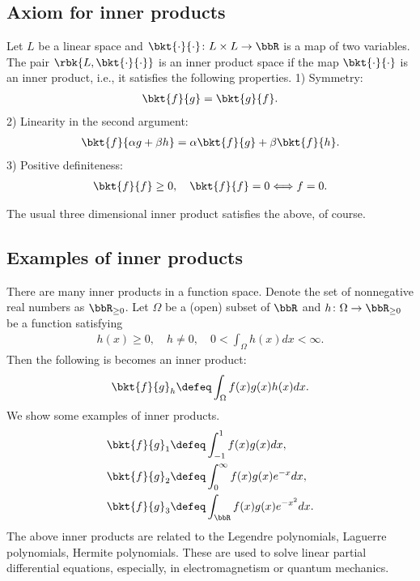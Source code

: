 \documentclass[openany, a4paper, oneside]{jsbook}
\begin{document}
\subsection{Axiom for inner products}

\begin{axm}
 Let $L$ be a linear space and $\bkt{\cdot}{\cdot} \colon L \times L \to \bbR$ is a map of two variables.
 The pair $\rbk{L, \bkt{\cdot}{\cdot}}$ is an inner product space if the map $\bkt{\cdot}{\cdot}$ is an inner product,
 i.e., it satisfies the following properties.
 1) Symmetry:
  \begin{align}
   \bkt{f}{g} = \bkt{g}{f}.
  \end{align}
 2) Linearity in the second argument:
  \begin{align}
   \bkt{f}{\alpha g + \beta h}
   =
   \alpha \bkt{f}{g} + \beta \bkt{f}{h}.
  \end{align}
 3) Positive definiteness:
  \begin{align}
   \bkt{f}{f} \geq 0, \quad
   \bkt{f}{f} = 0 \Longleftrightarrow f = 0.
  \end{align}
\end{axm}
\begin{rem}
 The usual three dimensional inner product satisfies the above, of course.
\end{rem}
\subsection{Examples of inner products}

There are many inner products in a function space.
Denote the set of nonnegative real numbers as $\bbR_{\geq 0}$.
Let $\Omega$ be a (open) subset of $\bbR$ and $h \colon \Omega \to \bbR_{\geq 0}$ be a function satisfying
\begin{align}
 h(x) \geq 0, \quad
 h \neq 0, \quad
 0 < \int_\Omega h(x) dx < \infty.
\end{align}
Then the following is becomes an inner product:
\begin{align}
 \bkt{f}{g}_{h}
 \defeq
 \int_{\Omega} f(x) g(x) h(x) dx.
\end{align}
We show some examples of inner products.
\begin{align}
 \bkt{f}{g}_1
 &\defeq
 \int_{-1}^{1} f(x) g(x) dx, \\
 \bkt{f}{g}_2
 &\defeq
 \int_{0}^{\infty} f(x) g(x) e^{-x} dx, \\
 \bkt{f}{g}_3
 &\defeq
 \int_{\bbR} f(x) g(x) e^{-x^2} dx.
\end{align}
The above inner products are related to
the Legendre polynomials, Laguerre polynomials, Hermite polynomials.
These are used to solve linear partial differential equations,
especially, in electromagnetism or quantum mechanics.
\end{document}
